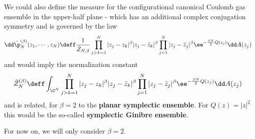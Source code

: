 We could also define the measure for the configurational canonical Coulomb gas ensemble in the upper-half plane  - which has an additional complex conjugation symmetry and is governed by the law 
\begin{equation}
	\dd \tilde{\p}_N^{(\beta)} (z_1, \cdots, z_N) \deff \frac{1}{\tilde{Z}_{N,\beta}} \prod_{j > k = 1}^{N} |z_j - z_k|^\beta |z_j - \bar{z}_k|^\beta \prod_{j=1}^{N} |z_j - \bar{z}_j|^\beta  \ee^{- \frac{\beta N}{2} Q(z_j)} \dd A(z_j)
\end{equation}
and would imply the normalization constant
\begin{equation}
	\tilde{Z}_N^{(\beta)} \deff \int_{\C^N} \prod_{j > k = 1}^{N} |z_j - z_k|^\beta |z_j - \bar{z}_k|^\beta \prod_{j=1}^{N} |z_j - \bar{z}_j|^\beta  \ee^{- \frac{\beta N}{2} Q(z_j)} \dd A(z_j)
\end{equation}
and is related, for $\beta = 2$ to the \textbf{planar symplectic ensemble}. For $Q(z) = |z|^2$ this would be the so-called \textbf{symplectic Ginibre ensemble}.

For now on, we will only consider $\beta = 2$.